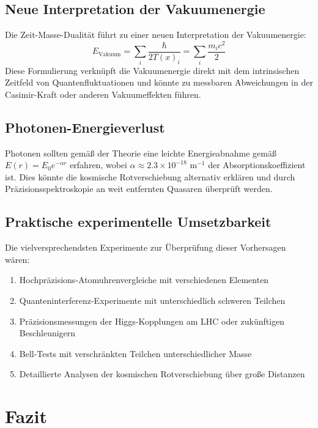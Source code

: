 \documentclass[a4paper,12pt]{article}
\newcommand{\Tfield}{T(x)} %
\begin{document}
	\subsection{Neue Interpretation der Vakuumenergie}
	
	Die Zeit-Masse-Dualität führt zu einer neuen Interpretation der Vakuumenergie:
	\begin{equation}
		E_{\text{Vakuum}} = \sum_i \frac{\hbar}{2\Tfield_i} = \sum_i \frac{m_i c^2}{2}
	\end{equation}
	Diese Formulierung verknüpft die Vakuumenergie direkt mit dem intrinsischen Zeitfeld von Quantenfluktuationen und könnte zu messbaren Abweichungen in der Casimir-Kraft oder anderen Vakuumeffekten führen.
	
	\subsection{Photonen-Energieverlust}
	
	Photonen sollten gemäß der Theorie eine leichte Energieabnahme gemäß $E(r) = E_0 e^{-\alpha r}$ erfahren, wobei $\alpha \approx 2.3 \times 10^{-18} \text{ m}^{-1}$ der Absorptionskoeffizient ist. Dies könnte die kosmische Rotverschiebung alternativ erklären und durch Präzisionsspektroskopie an weit entfernten Quasaren überprüft werden.
	
	\subsection{Praktische experimentelle Umsetzbarkeit}
	
	Die vielversprechendsten Experimente zur Überprüfung dieser Vorhersagen wären:
	\begin{enumerate}
		\item Hochpräzisions-Atomuhrenvergleiche mit verschiedenen Elementen
		\item Quanteninterferenz-Experimente mit unterschiedlich schweren Teilchen
		\item Präzisionsmessungen der Higgs-Kopplungen am LHC oder zukünftigen Beschleunigern
		\item Bell-Tests mit verschränkten Teilchen unterschiedlicher Masse
		\item Detaillierte Analysen der kosmischen Rotverschiebung über große Distanzen
	\end{enumerate}
	
	\section{Fazit}
	
\end{document}
